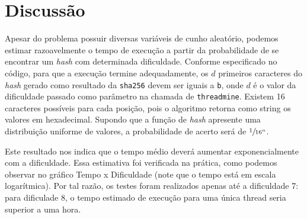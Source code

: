 \documentclass[12pt]{article}
\begin{document}
\section{Discussão}
Apesar do problema possuir diversas variáveis de cunho aleatório,
podemos estimar razoavelmente o tempo de execução
a partir da probabilidade de se encontrar um \textit{hash} com determinada dificuldade.
Conforme especificado no código,
para que a execução termine adequadamente,
os $d$ primeiros caracteres
do \textit{hash} gerado como resultado
da \texttt{sha256} devem ser iguais a \texttt{\textquotesingle{}b\textquotesingle{}},
onde $d$ é o valor da dificuldade
passado como parâmetro na chamada de \texttt{threadmine}.
Existem 16 caracteres possíveis para cada posição,
pois o algoritmo retorna como string os valores em hexadecimal.
Supondo que a função de \textit{hash}
apresente uma distribuição uniforme de valores,
a probabilidade de acerto será de $\sfrac{1}{16^{n}}$.

Este resultado nos indica que o tempo médio
deverá aumentar exponencialmente com a dificuldade.
Essa estimativa foi verificada na prática,
como podemos observar no gráfico Tempo x Dificuldade
(note que o tempo está em escala logarítmica).
Por tal razão, os testes foram realizados apenas até a dificuldade 7:
para dificulade 8, o tempo estimado de execução
para uma única thread seria superior a uma hora.

\nocite{*}
\printbibliography
\end{document}

